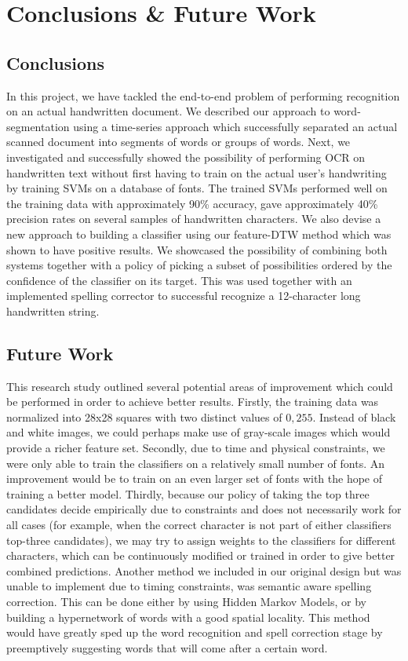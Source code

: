\documentclass[12pt]{article}
\begin{document}
\section{Conclusions \& Future Work}
\label{section:conclusion}
	
	\subsection{Conclusions}
	In this project, we have tackled the end-to-end problem of performing recognition on an actual handwritten document. We described our approach to word-segmentation using a time-series approach which successfully separated an actual scanned document into segments of words or groups of words. Next, we investigated and successfully showed the possibility of performing OCR on handwritten text without first having to train on the actual user's handwriting by training SVMs on a database of fonts. The trained SVMs performed well on the training data with approximately 90\% accuracy, gave approximately 40\% precision rates on several samples of handwritten characters. We also devise a new approach to building a classifier using our feature-DTW method which was shown to have positive results. We showcased the possibility of combining both systems together with a policy of picking a subset of possibilities ordered by the confidence of the classifier on its target. This was used together with an implemented spelling corrector to successful recognize a 12-character long handwritten string. 
	
	\subsection{Future Work}
	This research study outlined several potential areas of improvement which could be performed in order to achieve better results. Firstly, the training data was normalized into 28x28 squares with two distinct values of ${0, 255}$. Instead of black and white images, we could perhaps make use of gray-scale images which would provide a richer feature set. Secondly, due to time and physical constraints, we were only able to train the classifiers on a relatively small number of fonts. An improvement would be to train on an even larger set of fonts with the hope of training a better model. Thirdly, because our policy of taking the top three candidates decide empirically due to constraints and does not necessarily work for all cases (for example, when the correct character is not part of either classifiers top-three candidates), we may try to assign weights to the classifiers for different characters, which can be continuously modified or trained in order to give better combined predictions. Another method we included in our original design but was unable to implement due to timing constraints, was semantic aware spelling correction. This can be done either by using Hidden Markov Models, or by building a hypernetwork of words with a good spatial locality. This method would have greatly sped up the word recognition and spell correction stage by preemptively suggesting words that will come after a certain word.
\end{document}
